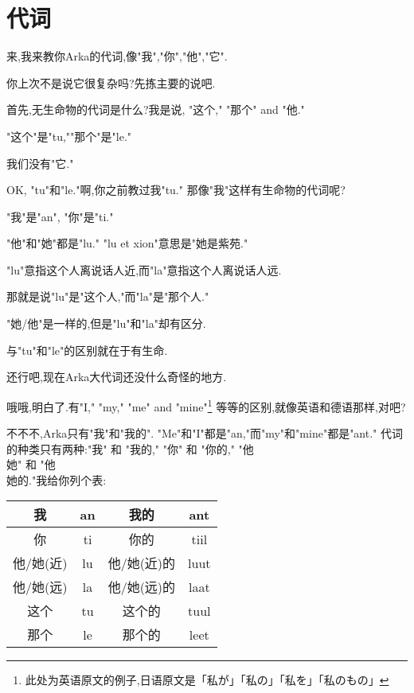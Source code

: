 \chapter[代词]{代词}

来,我来教你Arka的代词,像"我","你","他","它".


你上次不是说它很复杂吗?先拣主要的说吧.

首先,无生命物的代词是什么?我是说, "这个," "那个" and "他."


"这个"是"tu,""那个"是"le."

我们没有"它."


OK, "tu"和"le."啊,你之前教过我"tu."
那像"我"这样有生命物的代词呢?


"我"是"an", "你"是"ti."

"他"和"她"都是"lu." "lu et xion"意思是"她是紫苑."

"lu"意指这个人离说话人近,而"la"意指这个人离说话人远.


那就是说"lu"是"这个人,"而"la"是"那个人."

"她/他"是一样的,但是"lu"和"la"却有区分.

与"tu"和"le"的区别就在于有生命.

还行吧,现在Arka大代词还没什么奇怪的地方.

哦哦,明白了.有"I," "my," "me" and "mine"\footnote{此处为英语原文的例子,日语原文是「私が」「私の」「私を」「私のもの」}
等等的区别,就像英语和德语那样,对吧?


不不不,Arka只有"我"和"我的".
"Me"和"I"都是"an,"而"my"和"mine"都是"ant."
代词的种类只有两种:"我" 和 "我的," "你" 和 "你的," "他\\她" 和 "他\\她的."我给你列个表:
\begin{table}[H]
    \begin{tabular}{|c|c|c|c|} %
    \hline
	我&  an&  我的&  ant\\\hline
	你&  ti&  你的&  tiil\\\hline
  	他/她(近)&  lu&  他/她(近)的&  luut\\\hline
	他/她(远)&  la&  他/她(远)的&  laat\\\hline
	这个&  tu&  这个的&  tuul\\\hline
	那个&  le&  那个的&  leet\\\hline
	\end{tabular}
\end{table}

